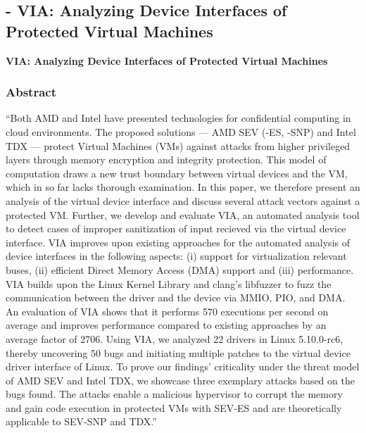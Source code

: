 
\subsection{\cite{hetzelt_via_2021} - VIA: Analyzing Device Interfaces of Protected Virtual Machines}

\textbf{VIA: Analyzing Device Interfaces of Protected Virtual Machines}

\subsubsection*{Abstract \cite{hetzelt_via_2021} }
“Both AMD and Intel have presented technologies for confidential computing in cloud environments. The proposed solutions — AMD SEV (-ES, -SNP) and Intel TDX — protect Virtual Machines (VMs) against attacks from higher privileged layers through memory encryption and integrity protection. This model of computation draws a new trust boundary between virtual devices and the VM, which in so far lacks thorough examination. In this paper, we therefore present an analysis of the virtual device interface and discuss several attack vectors against a protected VM. Further, we develop and evaluate VIA, an automated analysis tool to detect cases of improper sanitization of input recieved via the virtual device interface. VIA improves upon existing approaches for the automated analysis of device interfaces in the following aspects: (i) support for virtualization relevant buses, (ii) efficient Direct Memory Access (DMA) support and (iii) performance. VIA builds upon the Linux Kernel Library and clang’s libfuzzer to fuzz the communication between the driver and the device via MMIO, PIO, and DMA. An evaluation of VIA shows that it performs 570 executions per second on average and improves performance compared to existing approaches by an average factor of 2706. Using VIA, we analyzed 22 drivers in Linux 5.10.0-rc6, thereby uncovering 50 bugs and initiating multiple patches to the virtual device driver interface of Linux. To prove our findings’ criticality under the threat model of AMD SEV and Intel TDX, we showcase three exemplary attacks based on the bugs found. The attacks enable a malicious hypervisor to corrupt the memory and gain code execution in protected VMs with SEV-ES and are theoretically applicable to SEV-SNP and TDX.” 

